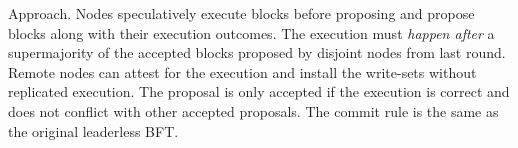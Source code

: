 Approach.
Nodes speculatively execute blocks before proposing and propose blocks along with their execution outcomes.
The execution must \emph{happen after} a supermajority of the accepted blocks proposed by disjoint nodes from last round.
Remote nodes can attest for the execution and install the write-sets without replicated execution.
The proposal is only accepted if the execution is correct and does not conflict with other accepted proposals.
The commit rule is the same as the original leaderless BFT.
